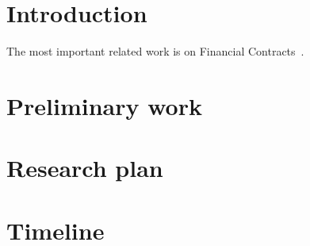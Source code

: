 \section{Introduction}
\lipsum[6-7]

The most important related work is on Financial Contracts~\cite{financial-contracts:icfp2000}.

\lipsum

\section{Preliminary work}
\lipsum

\section{Research plan}
\lipsum

\section{Timeline}
\lipsum[10-11]
